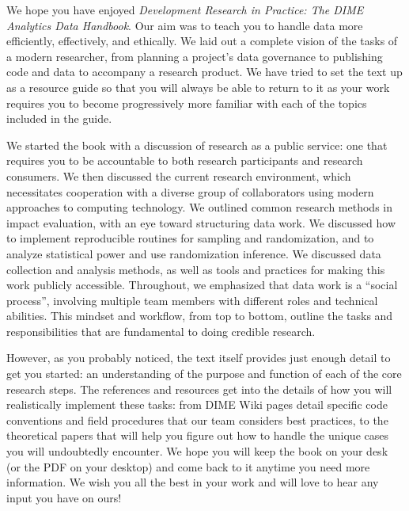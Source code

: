 We hope you have enjoyed \textit{Development Research in Practice: The DIME Analytics Data Handbook}.
Our aim was to teach you to handle data more efficiently, effectively, and ethically.
We laid out a complete vision of the tasks of a modern researcher,
from planning a project's data governance to publishing code and data
to accompany a research product.
We have tried to set the text up as a resource guide
so that you will always be able to return to it
as your work requires you to become progressively more familiar
with each of the topics included in the guide.

We started the book with a discussion of research as a public service:
one that requires you to be accountable to both research participants
and research consumers.
We then discussed the current research environment,
which necessitates cooperation with a diverse group of collaborators
using modern approaches to computing technology.
We outlined common research methods in impact evaluation,
with an eye toward structuring data work.
We discussed how to implement reproducible routines for sampling and randomization,
and to analyze statistical power and use randomization inference.
We discussed data collection
and analysis methods,
as well as tools and practices for making this work publicly accessible.
Throughout, we emphasized that data work is a ``social process'',
involving multiple team members with different roles and technical abilities.
This mindset and workflow, from top to bottom,
outline the tasks and responsibilities
that are fundamental to doing credible research.

However, as you probably noticed, the text itself provides
just enough detail to get you started:
an understanding of the purpose and function of each of the core research steps.
The references and resources get into the details
of how you will realistically implement these tasks:
from DIME Wiki pages detail specific code conventions
and field procedures that our team considers best practices,
to the theoretical papers that will help you figure out
how to handle the unique cases you will undoubtedly encounter.
We hope you will keep the book on your desk
(or the PDF on your desktop)
and come back to it anytime you need more information.
We wish you all the best in your work
and will love to hear any input you have on ours!

